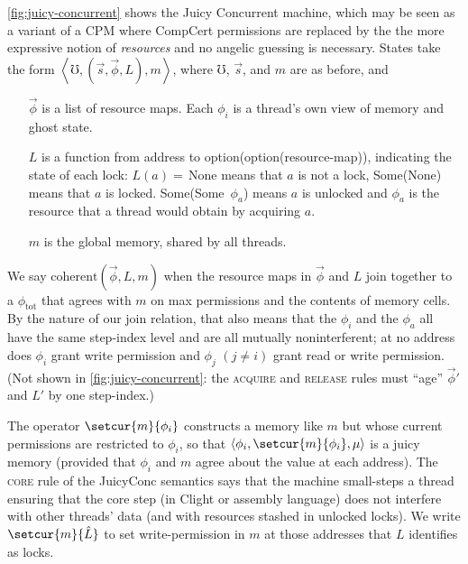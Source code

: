   \autoref{fig:juicy-concurrent} shows the Juicy Concurrent machine,
  which may be seen as a variant of a CPM where CompCert permissions
  are replaced by the the more expressive notion of \emph{resources}
  and no angelic guessing is necessary.  States take the form
  $\left<\mho, (\vec{s}, \vec{\phi}, L), m \right>$, where $\mho$, $\vec{s}$, and $m$ are as before, and 
\begin{itemize}
\item[$\vec{\phi}$] is a list of resource maps.
  Each $\phi_i$ is a thread's own view of memory and ghost state.
\item[$L$] is a function from address to option(option(resource-map)),
  indicating the state of each lock: $L(a)=\,$None means that $a$ is not
  a lock, Some(None) means that $a$ is locked.  Some(Some~$\phi_a$) means
  $a$ is unlocked and $\phi_a$ is the resource that a thread would obtain
  by acquiring $a$.  
\item[$m$] is the global memory, shared by all threads.
\end{itemize}
We say $\mathrm{coherent}(\vec{\phi},L,m)$ when
the resource maps in $\vec{\phi}$ and $L$ join together to a
$\phi_\mathrm{tot}$ that agrees with $m$
on max permissions and the contents of memory cells.
By the nature of our
join relation, that also means that the $\phi_i$ and the $\phi_a$
all have the same step-index level and
are all mutually noninterferent; at no address does $\phi_i$
grant write permission and $\phi_j$ \linebreak[3] $(j\not= i)$
grant read or write permission.
(Not shown in \autoref{fig:juicy-concurrent}:
the \textsc{acquire} and \textsc{release} rules
must ``age'' $\vec{\phi}'$ and $L'$ by one step-index.)


The operator $\setcur{m}{\phi_i}$ constructs a memory like $m$ but
whose current permissions are restricted to $\phi_i$, so that
$\left<\phi_i,\setcur{m}{\phi_i},\mu \right>$ is a juicy memory
(provided that $\phi_i$ and $m$ agree about the value at each
address).  The \textsc{core} rule of the JuicyConc semantics says that
the machine small-steps a thread ensuring that the core step (in
Clight or assembly language) does not interfere with other threads'
data (and with resources stashed in unlocked locks).  We write
$\setcur{m}{\hat{L}}$ to set write-permission in $m$ at those
addresses that $L$ identifies as locks.


